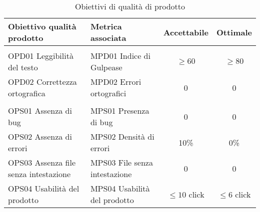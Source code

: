 \documentclass[../piano_di_qualifica.tex]{subfiles}
\begin{document}
\begin{table}[!ht]
	\centering
	\begin{tabular}{|l|l|c|c|}
		\hline
		\rowcolor{lightgray}
		\textbf{Obiettivo qualità prodotto}                    	& \textbf{Metrica associata}             & \textbf{Accettabile} & \textbf{Ottimale} \\	
		\hline \rowcolor{lightgray} \multicolumn{4}{|c|}{Documenti} \\
		\hline 
		OPD01 Leggibilità del testo           	& MPD01 Indice di Gulpease      & \(\ge 60\)           & \(\ge 80\)           \\
		OPD02 Correttezza ortografica         	& MPD02 Errori ortografici      & 0                    & 0                    \\
		\hline \rowcolor{lightgray} \multicolumn{4}{|c|}{Software} \\
		\hline
		OPS01 Assenza di bug                  	& MPS01 Presenza di bug         & 0                    & 0                    \\
		OPS02 Assenza di errori              	& MPS02 Densità di errori       & 10\%                 & 0\%                  \\
		OPS03 Assenza file senza intestazione 	& MPS03 File senza intestazione & 0                    & 0                    \\
		OPS04 Usabilità del prodotto          	& MPS04 Usabilità del prodotto  & \(\leq10\) click     & \(\leq6\) click      \\
		\hline
	\end{tabular}
	\caption{Obiettivi di qualità di prodotto}
\end{table}
\end{document}
